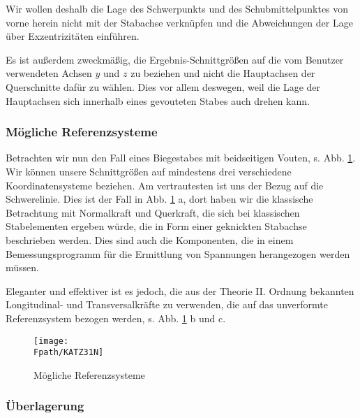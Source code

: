 Wir wollen deshalb die Lage des Schwerpunkts und des Schubmittelpunktes von vorne herein nicht mit der Stabachse verkn\"{u}pfen und die Abweichungen der Lage \"{u}ber Exzentrizit\"{a}ten einf\"{u}hren.

Es ist au{\ss}erdem zweckm\"{a}{\ss}ig, die Ergebnis-Schnittgr\"{o}{\ss}en auf die vom Benutzer verwendeten Achsen $y$ und $z$ zu beziehen und nicht die Hauptachsen der Querschnitte daf\"{u}r zu w\"{a}hlen. Dies vor allem deswegen, weil die Lage der Hauptachsen sich innerhalb eines gevouteten Stabes auch drehen kann. %

{\textcolor{sectionTitleBlue}{\subsubsection*{M\"{o}gliche Referenzsysteme}}}

Betrachten wir nun den Fall eines Biegestabes mit beidseitigen Vouten, s. Abb. \ref{Katz31}. Wir k\"{o}nnen unsere Schnittgr\"{o}{\ss}en auf mindestens drei verschiedene Koordinatensysteme beziehen. Am vertrautesten ist uns der Bezug auf die Schwerelinie. Dies ist der Fall in Abb. \ref{Katz31} a, dort haben wir die klassische Betrachtung mit Normalkraft und Querkraft, die sich bei klassischen Stabelementen ergeben w\"{u}rde, die in Form einer geknickten Stabachse beschrieben werden. Dies sind auch die Komponenten, die in einem Bemessungsprogramm f\"{u}r die Ermittlung von Spannungen herangezogen werden m\"{u}ssen.

Eleganter und effektiver ist es jedoch, die aus der Theorie II. Ordnung bekannten Longitudinal- und Transversalkr\"{a}fte zu verwenden, die auf das unverformte Referenzsystem bezogen werden, s. Abb. \ref{Katz31} b und c.
\begin{figure}[tbp] \centering
\if {} \sidecaption \fi
\texttt{[image: \\Fpath/KATZ31N]}
\caption{M\"{o}gliche Referenzsysteme}
\label{Katz31}%
\end{figure}%

{\textcolor{sectionTitleBlue}{\subsubsection*{\"{U}berlagerung}}}

